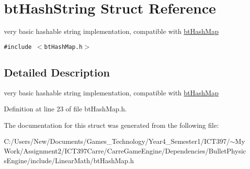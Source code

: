 \hypertarget{structbt_hash_string}{
\section{btHashString Struct Reference}
\label{structbt_hash_string}
}
very basic hashable string implementation, compatible with \hyperlink{classbt_hash_map}{btHashMap}  


{\tt \#include $<$btHashMap.h$>$}



\subsection{Detailed Description}
very basic hashable string implementation, compatible with \hyperlink{classbt_hash_map}{btHashMap} 

Definition at line 23 of file btHashMap.h.

The documentation for this struct was generated from the following file:\begin{CompactItemize}
\item 
C:/Users/New/Documents/Games\_\-Technology/Year4\_\-Semester1/ICT397/$\sim$My Work/Assignment2/ICT397Carre/CarreGameEngine/Dependencies/BulletPhysicsEngine/include/LinearMath/btHashMap.h\end{CompactItemize}
